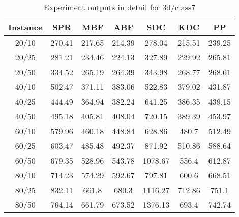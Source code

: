 \begin{table}[ht!]
    \caption{Experiment outputs in detail for 3d/class7}
    \centering
    \begin{tabular}{@{}ccccccc@{}}
        \toprule
        {\bfseries Instance} & {\bfseries SPR} & {\bfseries MBF}
        & {\bfseries ABF} & {\bfseries SDC} & {\bfseries KDC} & {\bfseries PP}\\
        \midrule
        20/10 & 270.41 & 217.65 & 214.39 & 278.04 & 215.51 & 239.25\\
        20/25 & 281.21 & 234.46 & 224.13 & 327.89 & 229.92 & 265.81\\
        20/50 & 334.52 & 265.19 & 264.39 & 343.98 & 268.77 & 268.61\\
        40/10 & 502.47 & 371.11 & 383.06 & 522.83 & 379.02 & 431.87\\
        40/25 & 444.49 & 364.94 & 382.24 & 641.25 & 386.35 & 439.15\\
        40/50 & 495.18 & 405.81 & 408.04 & 720.15 & 389.39 & 453.97\\
        60/10 & 579.96 & 460.18 & 448.84 & 628.86 & 480.7 & 512.49\\
        60/25 & 603.47 & 485.48 & 492.37 & 871.92 & 510.86 & 588.64\\
        60/50 & 679.35 & 528.96 & 543.78 & 1078.67 & 556.4 & 612.87\\
        80/10 & 714.23 & 574.29 & 592.67 & 797.81 & 600.6 & 668.51\\
        80/25 & 832.11 & 661.8 & 680.3 & 1116.27 & 712.86 & 751.1\\
        80/50 & 764.14 & 661.79 & 673.52 & 1376.13 & 693.4 & 742.74\\
        \bottomrule
    \end{tabular}
\end{table}